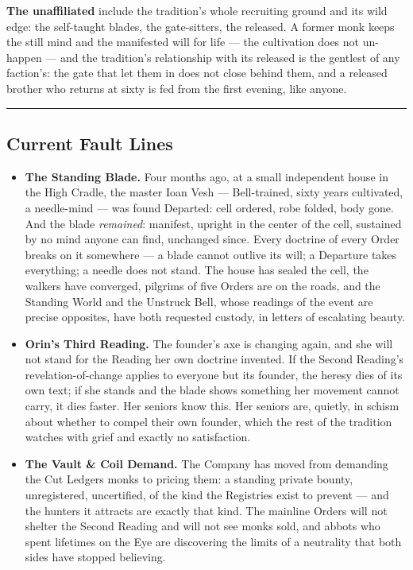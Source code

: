 \textbf{The unaffiliated} include the tradition's whole recruiting ground and its wild edge: the self-taught blades, the gate-sitters, the released. A former monk keeps the still mind and the manifested will for life --- the cultivation does not un-happen --- and the tradition's relationship with its released is the gentlest of any faction's: the gate that let them in does not close behind them, and a released brother who returns at sixty is fed from the first evening, like anyone.

\medskip\hrule\medskip

\subsection{Current Fault Lines}

\begin{itemize}
    \item \textbf{The Standing Blade.} Four months ago, at a small independent house in the High Cradle, the master Ioan Vesh --- Bell-trained, sixty years cultivated, a needle-mind --- was found Departed: cell ordered, robe folded, body gone. And the blade \textit{remained}: manifest, upright in the center of the cell, sustained by no mind anyone can find, unchanged since. Every doctrine of every Order breaks on it somewhere --- a blade cannot outlive its will; a Departure takes everything; a needle does not stand. The house has sealed the cell, the walkers have converged, pilgrims of five Orders are on the roads, and the Standing World and the Unstruck Bell, whose readings of the event are precise opposites, have both requested custody, in letters of escalating beauty.
    \item \textbf{Orin's Third Reading.} The founder's axe is changing again, and she will not stand for the Reading her own doctrine invented. If the Second Reading's revelation-of-change applies to everyone but its founder, the heresy dies of its own text; if she stands and the blade shows something her movement cannot carry, it dies faster. Her seniors know this. Her seniors are, quietly, in schism about whether to compel their own founder, which the rest of the tradition watches with grief and exactly no satisfaction.
    \item \textbf{The Vault \& Coil Demand.} The Company has moved from demanding the Cut Ledgers monks to pricing them: a standing private bounty, unregistered, uncertified, of the kind the Registries exist to prevent --- and the hunters it attracts are exactly that kind. The mainline Orders will not shelter the Second Reading and will not see monks sold, and abbots who spent lifetimes on the Eye are discovering the limits of a neutrality that both sides have stopped believing.

\end{itemize}
